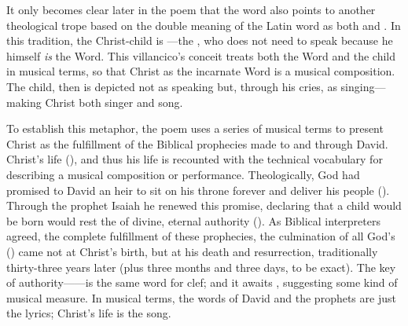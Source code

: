 
It only becomes clear later in the poem that the word  also
points to another theological trope based on the double meaning of the Latin
word  as both  and .
In this tradition, the Christ-child is ---the
, who does not need to speak because he himself
\emph{is} the Word.
This villancico's conceit treats both the Word and the child in musical terms,
so that Christ as the incarnate Word is a musical composition.
The child, then is depicted not as speaking but, through his cries, as
singing---making Christ both singer and song.

To establish this metaphor, the poem uses a series of musical terms to present
Christ as the fulfillment of the Biblical prophecies made to and through David.
Christ's life  (), and
thus his life is recounted with the technical vocabulary for describing a
musical composition or performance.
Theologically, God had promised to David an heir to sit on his throne forever
and deliver his people ().
Through the prophet Isaiah he renewed this promise, declaring that a child
would be born  would rest the  of
divine, eternal authority ().
As Biblical interpreters agreed, the complete fulfillment of these prophecies,
the culmination of all God's 
() came not at Christ's birth, but at his death and resurrection,
traditionally thirty-three years later (plus three months and three days, to be
exact).%
    \Autocites
    [17]{Lapide:Gospels19C}
    []{Ricciardo:CommentariaSymbolica}
    []{Bongo:NumerorumMysteria}
    [for an earlier use of same number symbol by Gutiérrez de Padilla, see][]
    {Cashner:Cards}
The key of authority------is the same word for clef; and it awaits
, suggesting some kind of musical measure.
In musical terms, the words of David and the prophets are just the lyrics;
Christ's life is the song.


